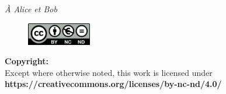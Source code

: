 \vfill
\begin{flushright}
    \vfill
	\hfill
	\emph{À Alice et Bob}
	\vfill
\end{flushright}
\mbox{}
\vfill
\begin{figure}
    \begin{center}
        \vspace{-\baselineskip}
        \includegraphics[width=0.25\textwidth]{figures/thesis-copyright.png}
    \end{center}
\end{figure}
\noindent
\textbf{Copyright:}\\
Except where otherwise noted,
this work is licensed under\\
\textbf{https://creativecommons.org/licenses/by-nc-nd/4.0/}